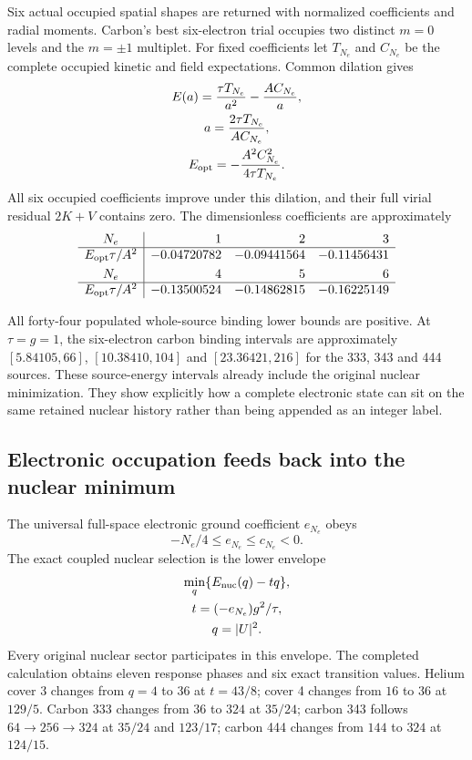 Six actual occupied spatial shapes are returned with normalized coefficients and radial moments. Carbon's best six-electron trial occupies two distinct $m=0$ levels and the $m=\pm1$ multiplet. For fixed coefficients let $T_{N_e}$ and $C_{N_e}$ be the complete occupied kinetic and field expectations. Common dilation gives
\[
\begin{gathered}
E(a)=\frac{\tau T_{N_e}}{a^2}-\frac{A C_{N_e}}a,
 \\
 a=\frac{2\tau T_{N_e}}{A C_{N_e}},
 \\
 E_{\rm opt}=-\frac{A^2 C_{N_e}^2}{4\tau T_{N_e}}.
\end{gathered}
\]
All six occupied coefficients improve under this dilation, and their full virial residual $2K+V$ contains zero. The dimensionless coefficients are approximately
\[
\begin{array}{c|rrr}
 N_e&1&2&3\\\hline
 E_{\rm opt}\tau/A^2&-0.04720782&-0.09441564&-0.11456431\\[3pt]
 N_e&4&5&6\\\hline
 E_{\rm opt}\tau/A^2&-0.13500524&-0.14862815&-0.16225149
\end{array}
\]

All forty-four populated whole-source binding lower bounds are positive. At $\tau=g=1$, the six-electron carbon binding intervals are approximately $[5.84105,66]$, $[10.38410,104]$ and $[23.36421,216]$ for the 333, 343 and 444 sources. These source-energy intervals already include the original nuclear minimization. They show explicitly how a complete electronic state can sit on the same retained nuclear history rather than being appended as an integer label.

\subsection{Electronic occupation feeds back into the nuclear minimum}

The universal full-space electronic ground coefficient $e_{N_e}$ obeys
\[
 -N_e/4\leq e_{N_e}\leq c_{N_e}<0.
\]
The exact coupled nuclear selection is the lower envelope
\[
\begin{gathered}
\min_q\{E_{\rm nuc}(q)-tq\},\\
 t=(-e_{N_e})g^2/\tau,\\
 q=|U|^2.
\end{gathered}
\]
Every original nuclear sector participates in this envelope. The completed calculation obtains eleven response phases and six exact transition values. Helium cover 3 changes from $q=4$ to $36$ at $t=43/8$; cover 4 changes from $16$ to $36$ at $129/5$. Carbon 333 changes from $36$ to $324$ at $35/24$; carbon 343 follows $64\to256\to324$ at $35/24$ and $123/17$; carbon 444 changes from $144$ to $324$ at $124/15$. 

